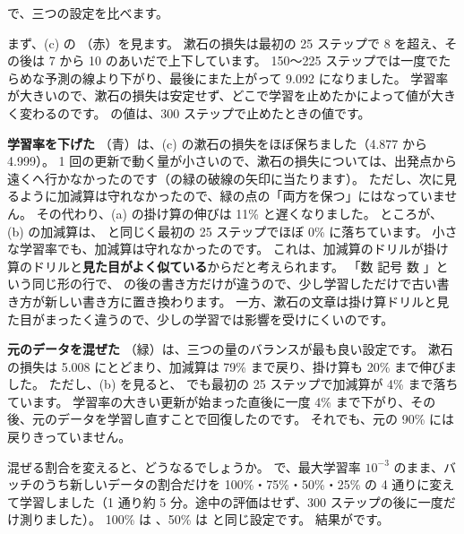 で、三つの設定を比べます。

まず、(c) の （赤）を見ます。
漱石の損失は最初の 25 ステップで 8 を超え、その後は 7 から 10 のあいだで上下しています。
150〜225 ステップでは一度でたらめな予測の線より下がり、最後にまた上がって 9.092 になりました。
学習率が大きいので、漱石の損失は安定せず、どこで学習を止めたかによって値が大きく変わるのです。
の値は、300 ステップで止めたときの値です。

\textbf{学習率を下げた }（青）は、(c) の漱石の損失をほぼ保ちました（4.877 から 4.999）。
1 回の更新で動く量が小さいので、漱石の損失については、出発点から遠くへ行かなかったのです（の緑の破線の矢印に当たります）。
ただし、次に見るように加減算は守れなかったので、緑の点の「両方を保つ」にはなっていません。
その代わり、(a) の掛け算の伸びは 11\% と遅くなりました。
ところが、(b) の加減算は、 と同じく最初の 25 ステップでほぼ 0\% に落ちています。
小さな学習率でも、加減算は守れなかったのです。
これは、加減算のドリルが掛け算のドリルと\textbf{見た目がよく似ている}からだと考えられます。
「数 記号 数 \code{=}」という同じ形の行で、\code{=} の後の書き方だけが違うので、少し学習しただけで古い書き方が新しい書き方に置き換わります。
一方、漱石の文章は掛け算ドリルと見た目がまったく違うので、少しの学習では影響を受けにくいのです。

\textbf{元のデータを混ぜた }（緑）は、三つの量のバランスが最も良い設定です。
漱石の損失は 5.008 にとどまり、加減算は 79\% まで戻り、掛け算も 20\% まで伸びました。
ただし、(b) を見ると、 でも最初の 25 ステップで加減算が 4\% まで落ちています。
学習率の大きい更新が始まった直後に一度 4\% まで下がり、その後、元のデータを学習し直すことで回復したのです。
それでも、元の 90\% には戻りきっていません。

混ぜる割合を変えると、どうなるでしょうか。
 で、最大学習率 $10^{-3}$ のまま、バッチのうち新しいデータの割合だけを 100\%・75\%・50\%・25\% の 4 通りに変えて学習しました（1 通り約 5 分。途中の評価はせず、300 ステップの後に一度だけ測りました）。
100\% は 、50\% は  と同じ設定です。
結果がです。

